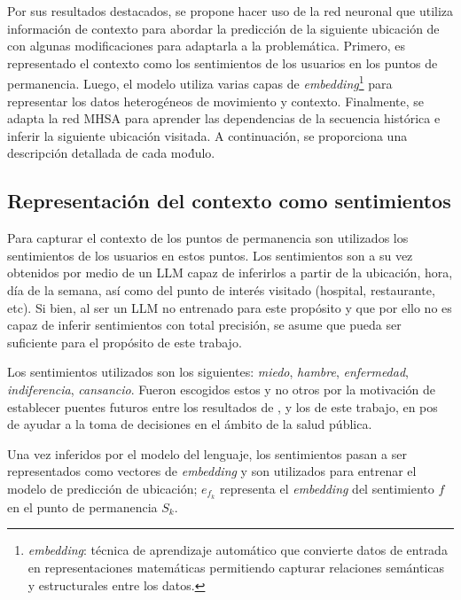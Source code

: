 Por sus resultados destacados, se propone hacer uso de la red neuronal 
que utiliza información de contexto para 
abordar la predicción de la siguiente ubicación de \cite{Hong_2023}
con algunas modificaciones para adaptarla a la problemática. Primero, es representado el contexto 
como los sentimientos de los usuarios en los puntos de permanencia. 
Luego, el modelo utiliza varias capas de \textit{embedding}\footnote{\textit{embedding}: 
técnica de aprendizaje automático que convierte datos de entrada en
representaciones matem\'aticas permitiendo capturar relaciones
sem\'anticas y estructurales entre los datos.} para representar los 
datos heterogéneos de movimiento y contexto. Finalmente, 
se adapta la red MHSA para aprender las dependencias de la 
secuencia histórica e inferir la siguiente ubicación visitada. 
A continuación, se proporciona una descripción 
detallada de cada mo\'dulo.

\subsection{Representación del contexto como sentimientos}
\label{sec:sents}
Para capturar el contexto de los puntos de permanencia son utilizados 
los sentimientos de los usuarios en estos puntos. Los sentimientos son a su vez
obtenidos por medio de un LLM capaz de inferirlos a partir
de la ubicación, hora, d\'ia de la semana, as\'i como del punto de inter\'es
visitado (hospital, restaurante, etc). Si bien, al ser un LLM 
no entrenado para este prop\'osito y que por ello
no es capaz de inferir sentimientos con total precisión,
se asume que pueda ser suficiente para el prop\'osito de este trabajo.

Los sentimientos utilizados
son los siguientes: \textit{miedo}, \textit{hambre}, 
\textit{enfermedad}, \textit{indiferencia}, \textit{cansancio}. Fueron 
escogidos estos y no otros por la motivaci\'on de establecer puentes futuros 
entre los resultados de \cite{Hernandez2023},
y los de este trabajo, en pos de ayudar a la toma de decisiones
en el \'ambito de la salud p\'ublica.

Una vez inferidos por el modelo del lenguaje, los sentimientos pasan a ser 
representados como vectores de \textit{embedding} y son utilizados
para entrenar el modelo de predicción de ubicación; \(e_{f_k}\) representa
el \textit{embedding} del sentimiento \(f\) en el punto de permanencia \(S_k\).\\

